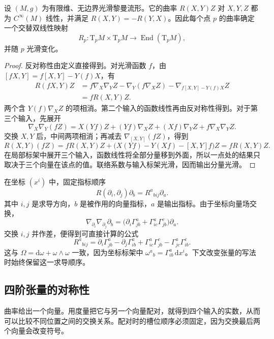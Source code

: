 \begin{proposition}\label{g3:prop:riemann-curvature-tensorial}
	设 \((M,g)\) 为有限维、无边界光滑黎曼流形。它的曲率 \(R(X,Y)Z\) 对 \(X,Y,Z\) 都为 \(C^\infty(M)\) 线性，并满足 \(R(X,Y)=-R(Y,X)\)。因此每个点 \(p\) 的曲率确定一个交替双线性映射
	\[
		R_p:\mathrm{T}_pM\times\mathrm{T}_pM
		\longrightarrow\operatorname{End}(\mathrm{T}_pM),
	\]
	并随 \(p\) 光滑变化。
\end{proposition}
\begin{proof}
	反对称性由定义直接得到。对光滑函数 \(f\)，由 \([fX,Y]=f[X,Y]-Y(f)X\)，有
	\begin{align*}
		R(fX,Y)Z
		&=f\nabla_X\nabla_YZ-\nabla_Y(f\nabla_XZ)
			-\nabla_{f[X,Y]-Y(f)X}Z\\
		&=fR(X,Y)Z.
	\end{align*}
	两个含 \(Y(f)\nabla_XZ\) 的项相消。第二个输入的函数线性再由反对称性得到。对于第三个输入，先展开
	\[
		\nabla_X\nabla_Y(fZ)
		=X(Yf)Z+(Yf)\nabla_XZ+(Xf)\nabla_YZ
			+f\nabla_X\nabla_YZ.
	\]
	交换 \(X,Y\) 后，中间两项相消；再减去 \(\nabla_{[X,Y]}(fZ)\)，得到
	\[
		R(X,Y)(fZ)
		=fR(X,Y)Z+\bigl(X(Yf)-Y(Xf)-[X,Y]f\bigr)Z
		=fR(X,Y)Z.
	\]
	在局部标架中展开三个输入，函数线性将全部分量移到外面，所以一点处的结果只取决于三个向量在该点的值。联络系数与输入标架光滑，因而输出分量光滑。
\end{proof}

在坐标 \((x^i)\) 中，固定指标顺序
\[
	R(\partial_i,\partial_j)\partial_b
	=R^a{}_{b i j}\partial_a.
\]
其中 \(i,j\) 是求导方向，\(b\) 是被作用的向量指标，\(a\) 是输出指标。由于坐标向量场交换，
\[
	\nabla_{\partial_i}\nabla_{\partial_j}\partial_b
	=\bigl(\partial_i\Gamma^a_{jb}
		+\Gamma^a_{ic}\Gamma^c_{jb}\bigr)\partial_a.
\]
交换 \(i,j\) 并作差，便得到可直接计算的公式
\begin{equation}\label{g3:eq:curvature-coordinate-components}
	R^a{}_{b i j}
	=\partial_i\Gamma^a_{jb}-\partial_j\Gamma^a_{ib}
	+\Gamma^a_{ic}\Gamma^c_{jb}-\Gamma^a_{jc}\Gamma^c_{ib}.
\end{equation}
这与 \(\Omega=\mathrm{d}\omega+\omega\wedge\omega\) 一致，因为坐标标架中 \(\omega^a{}_b=\Gamma^a_{ib}\,\mathrm{d}x^i\)。下文改变张量的写法时始终保留这一求导顺序。

\subsection{四阶张量的对称性}
\label{g3:subsec:0301:02}

曲率给出一个向量。用度量把它与另一个向量配对，就得到四个输入的实数，从而可以比较不同位置之间的交换关系。配对时的槽位顺序必须固定，因为交换最后两个向量会改变符号。

